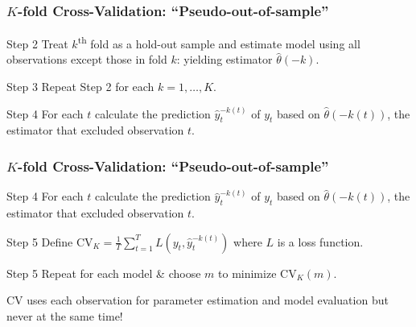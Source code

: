 \begin{frame}
  \frametitle{$K$-fold Cross-Validation: ``Pseudo-out-of-sample''}

  \begin{block}{Step 2}
    Treat $k$\textsuperscript{th} fold as a hold-out sample and estimate model using all observations \alert{except} those in fold $k$: yielding estimator $\widehat{\theta}(-k)$.
  \end{block}

  
  \begin{block}{Step 3}
    Repeat Step 2 for each $k = 1, \dots, K$. 
  \end{block}

  

  \begin{block}{Step 4}
    For each $t$ calculate the prediction $\widehat{y}_t^{-k(t)}$ of $y_t$ based on $\widehat{\theta}(-k(t))$, the estimator that excluded observation $t$. 
  \end{block}

\end{frame}
\begin{frame}
  \frametitle{$K$-fold Cross-Validation: ``Pseudo-out-of-sample''}

  \begin{block}{Step 4}
    For each $t$ calculate the prediction $\widehat{y}_t^{-k(t)}$ of $y_t$ based on $\widehat{\theta}(-k(t))$, the estimator that excluded observation $t$. 
  \end{block}

  

  \begin{block}{Step 5}
    Define $\text{CV}_K = \frac{1}{T}\sum_{t=1}^T L\left(y_t, \widehat{y}_t^{-k(t)}\right)$ where $L$ is a loss function. 
  \end{block}

  

  \begin{block}{Step 5}
    Repeat for each model \& choose $m$ to minimize $\text{CV}_K(m)$.
  \end{block}

  \alert{CV uses each observation for parameter estimation and model evaluation but never at the same time!}

\end{frame}
